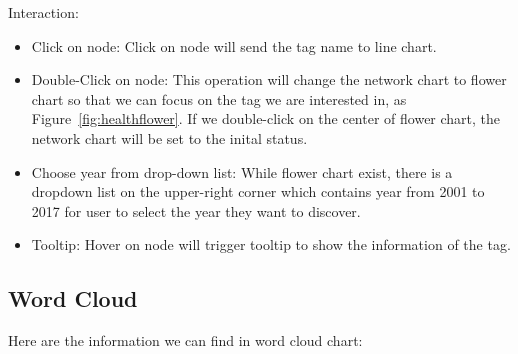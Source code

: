 \documentclass{report}
\numberwithin{figure}{section}
\begin{document}
\quad Interaction:

\begin{itemize}
\item
Click on node:
\newline \quad Click on node will send the tag name to line chart.
\item
Double-Click on node:
\newline \quad This operation will change the network chart to flower chart so that we can focus on the tag we are interested in, as Figure~\ref{fig:healthflower}. If we double-click on the center of flower chart, the network chart will be set to the inital status.
\item
Choose year from drop-down list:
\newline \quad While flower chart exist, there is a dropdown list on the upper-right corner which contains year from 2001 to 2017 for user to select the year they want to discover.

\item
Tooltip:
\newline \quad Hover on node will trigger tooltip to show the information of the tag.
\end{itemize}


\subsection{Word Cloud}

\quad Here are the information we can find in word cloud chart:
\end{document}

